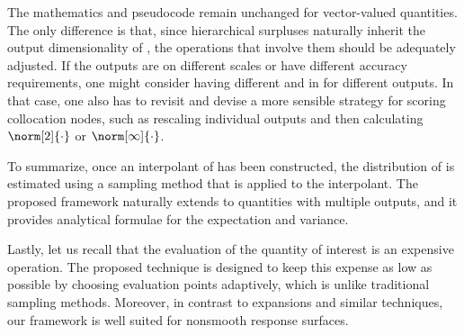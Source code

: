 \begin{remark} 
The mathematics and pseudocode remain unchanged for vector-valued quantities.
The only difference is that, since hierarchical surpluses naturally inherit the
output dimensionality of \g, the operations that involve them should be
adequately adjusted. If the outputs are on different scales or have different
accuracy requirements, one might consider having different  and
 in  for different outputs. In that case, one also has
to revisit  and devise a more sensible strategy for scoring
collocation nodes, such as rescaling individual outputs and then calculating
$\norm[2]{\cdot}$ or $\norm[\infty]{\cdot}$.
\end{remark}

To summarize, once an interpolant of \g has been constructed, the distribution
of \g is estimated using a sampling method that is applied to the interpolant.
The proposed framework naturally extends to quantities with multiple outputs,
and it provides analytical formulae for the expectation and variance.

Lastly, let us recall that the evaluation of the quantity of interest is an
expensive operation. The proposed technique is designed to keep this expense as
low as possible by choosing evaluation points adaptively, which is unlike
traditional sampling methods. Moreover, in contrast to  expansions and
similar techniques, our framework is well suited for nonsmooth response
surfaces.
